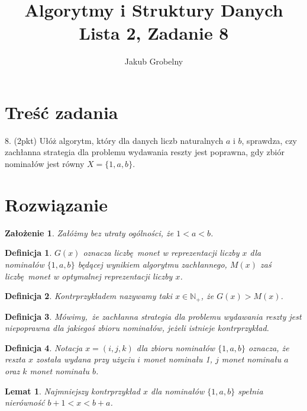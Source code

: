 \documentclass[12pt]{article}
\title{\bfseries Algorytmy i Struktury Danych\\\Large Lista 2, Zadanie 8}
\date{}
\author{\large Jakub Grobelny}
\newtheorem{definition}{Definicja}
\newtheorem*{assumption*}{Założenie}
\newtheorem{lemma}{Lemat}
\begin{document}
\begin{titlepage}
\maketitle
\thispagestyle{empty}

\section{Treść zadania}

8. (2pkt) Ułóż algorytm, który dla danych liczb naturalnych $a$ i $b$, sprawdza,
czy zachłanna strategia dla problemu wydawania reszty jest poprawna, gdy zbiór
nominałów jest równy $X = \{1, a, b\}$.

\section{Rozwiązanie}

\begin{assumption*}
\normalfont
Załóżmy bez utraty ogólności, że $1 < a < b$.
\end{assumption*}

\begin{definition}
\normalfont
$G(x)$ oznacza liczbę monet w reprezentacji liczby $x$ dla nominałów $\{1, a, b\}$ 
będącej wynikiem algorytmu zachłannego, $M(x)$ zaś liczbę monet w optymalnej
reprezentacji liczby $x$.
\end{definition}

\begin{definition}
\normalfont
Kontrprzykładem nazywamy taki $x \in \mathds{N_+}$, że $G(x) > M(x)$.
\end{definition}
    
\begin{definition}
\normalfont
Mówimy, że zachłanna strategia dla problemu wydawania reszty jest niepoprawna dla
jakiegoś zbioru nominałów, jeżeli istnieje kontrprzykład.
\end{definition}


\begin{definition}
\normalfont
Notacja $x = (i, j, k)$ dla zbioru nominałów $\{1, a, b\}$ oznacza, że reszta $x$ została wydana przy użyciu $i$
monet nominału 1, $j$ monet nominału $a$ oraz $k$ monet nominału $b$.
\end{definition}

\begin{lemma}\label{lm1}
\normalfont
Najmniejszy kontrprzykład $x$ dla nominałów $\{1, a, b\}$ 
spełnia nierówność $b + 1 < x < b + a$.


\end{lemma}
\end{titlepage}
\end{document}

